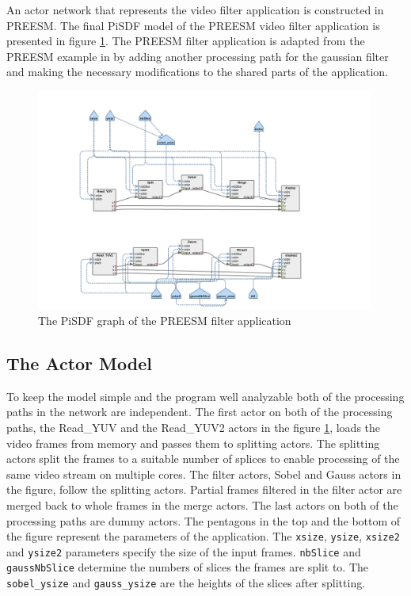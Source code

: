 An actor network that represents the video filter application is constructed in PREESM. The final PiSDF model of the PREESM video filter application is presented in figure \ref{fig:preesm_actors}. The PREESM filter application is adapted from the PREESM example in \cite{preesmtut} by adding another processing path for the gaussian filter and making the necessary modifications to the shared parts of the application.

\begin{figure}[h!]
    \begin{center}
        \includegraphics[width=0.99\textwidth]{images/preesm_diagram.png}
        \caption{The PiSDF graph of the PREESM filter application}
        \label{fig:preesm_actors}
    \end{center}
\end{figure}

\subsection{The Actor Model}
\label{subsec:actors}
To keep the model simple and the program well analyzable both of the processing paths in the network are independent. The first actor on both of the processing paths, the Read\_YUV and the Read\_YUV2 actors in the figure \ref{fig:preesm_actors}, loads the video frames from memory and passes them to splitting actors. The splitting actors split the frames to a suitable number of splices to enable processing of the same video stream on multiple cores. The filter actors, Sobel and Gauss actors in the figure, follow the splitting actors. Partial frames filtered in the filter actor are merged back to whole frames in the merge actors. The last actors on both of the processing paths are dummy actors. The pentagons in the top and the bottom of the figure represent the parameters of the application. The \texttt{xsize}, \texttt{ysize}, \texttt{xsize2} and \texttt{ysize2} parameters specify the size of the input frames. \texttt{nbSlice} and \texttt{gaussNbSlice} determine the numbers of slices the frames are split to. The \texttt{sobel\_ysize} and \texttt{gauss\_ysize} are the heights of the slices after splitting.

